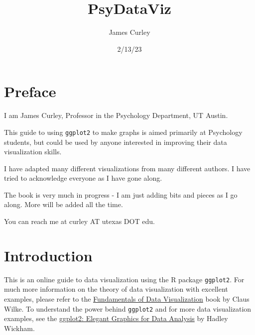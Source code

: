 \documentclass[
  letterpaper,
  DIV=11,
  numbers=noendperiod]{scrreprt}
\title{PsyDataViz}
\author{James Curley}
\date{2/13/23}
\renewcommand*\contentsname{Table of contents}
\newcommand\contentsname{Table of contents}
\begin{document}
\maketitle
\ifdefined\Shaded\renewenvironment{Shaded}{\begin{tcolorbox}[frame hidden, boxrule=0pt, enhanced, borderline west={3pt}{0pt}{shadecolor}, interior hidden, breakable, sharp corners]}{\end{tcolorbox}}\fi

\renewcommand*\contentsname{Table of contents}
{
\hypersetup{linkcolor=}
\setcounter{tocdepth}{2}
\tableofcontents
}

\hypertarget{preface}{%
\chapter*{Preface}\label{preface}}


I am James Curley, Professor in the Psychology Department, UT Austin.

This guide to using \texttt{ggplot2} to make graphs is aimed primarily
at Psychology students, but could be used by anyone interested in
improving their data visualization skills.

I have adapted many different visualizations from many different
authors. I have tried to acknowledge everyone as I have gone along.

The book is very much in progress - I am just adding bits and pieces as
I go along. More will be added all the time.

You can reach me at curley AT utexas DOT edu.


\hypertarget{introduction}{%
\chapter{Introduction}\label{introduction}}

This is an online guide to data visualization using the R package
\texttt{ggplot2}. For much more information on the theory of data
visualization with excellent examples, please refer to the
\href{https://serialmentor.com/dataviz/}{Fundamentals of Data
Visualization} book by Claus Wilke. To understand the power behind
\texttt{ggplot2} and for more data visualization examples, see the
\href{https://ggplot2-book.org/index.html}{ggplot2: Elegant Graphics for
Data Analysis} by Hadley Wickham.
\end{document}
